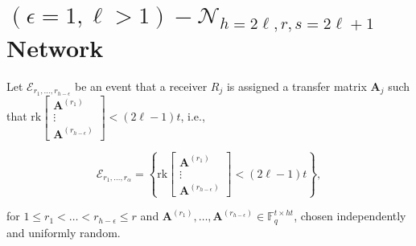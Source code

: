 \section{$\left(\epsilon=1,\ell>1\right)-\mathcal{N}_{h=2\ell,r,s=2\ell+1}$
Network}

Let $\mathcal{E}_{r_{1},\ldots,r_{h-\epsilon}}$ be an event that
a receiver $R_{j}$ is assigned a transfer matrix $\boldsymbol{A}_{j}$
such that $\mathrm{rk}\left[\begin{array}{c}
\boldsymbol{A}^{\left(r_{1}\right)}\\
\vdots\\
\boldsymbol{A}^{\left(r_{h-\epsilon}\right)}
\end{array}\right]<(2\ell-1)t$, i.e.,

\[
\mathcal{E}_{r_{1},\ldots,r_{\alpha}}=\left\{ \mathrm{rk}\left[\begin{array}{c}
\boldsymbol{A}^{\left(r_{1}\right)}\\
\vdots\\
\boldsymbol{A}^{\left(r_{h-\epsilon}\right)}
\end{array}\right]<\left(2\ell-1\right)t\right\} ,
\]

for $1\leq r_{1}<\ldots<r_{h-\epsilon}\leq r$ and $\boldsymbol{A}^{\left(r_{1}\right)},\ldots,\boldsymbol{A}^{\left(r_{h-\epsilon}\right)}\in\ensuremath{\mathbb{F}}_{q}^{t\times ht}$,
chosen independently and uniformly random.

